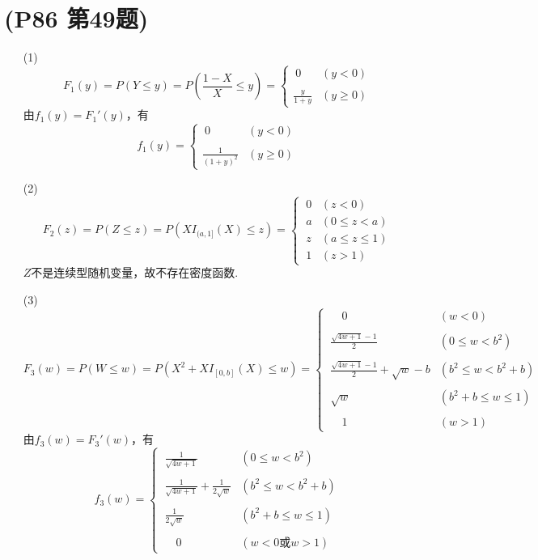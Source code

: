 \documentclass{article}
\begin{document}
\section{(P86 第49题)}  %
\begin{enumerate}
    \item [(1)]
    \[
        F_1 (y)= 
        P(Y\leq y)=  
        P(\frac{1-X}{X}\leq y)=
        \begin{cases}
            \ 0 & (y<0)\\
            \\
            \displaystyle{\frac{y}{1+y}} & (y\geq 0)
        \end{cases}   
    \]
    由$f_1(y) = F_1 '(y)$，有
    \[
        f_1 (y)=
        \begin{cases}
            \ 0 & (y<0)\\
            \\
            \displaystyle{\frac{1}{{(1+y)}^2}} & (y\geq 0)
        \end{cases}  
    \]
    \item [(2)]
    \[
        F_2 (z)=
        P(Z\leq z)=
        P(XI_{(a,1]} (X) \leq z)=
        \begin{cases}
            \ 0 & (z<0)\\
            \ a & (0\leq z <a)\\
            \ z & (a\leq z \leq 1)\\
            \ 1 & (z>1)
        \end{cases} 
    \]
    $Z$不是连续型随机变量，故不存在密度函数.
    \item [(3)]
    \[
        F_3 (w)=
        P(W\leq w)=
        P(X^2 + XI_{[0,b]}(X) \leq w)=
        \begin{cases}
            \ \quad 0 & (w<0)\\
            \\
            \ \displaystyle{\frac{\sqrt{4w+1}-1}{2}} & (0\leq w < b^2)\\
            \\
            \ \displaystyle{\frac{\sqrt{4w+1}-1}{2} + \sqrt{w}-b} & (b^2 \leq w < b^2 +b) \\
            \\
            \ \sqrt{w} & (b^2 + b \leq w \leq 1)\\
            \\
            \ \quad 1 & (w>1)
        \end{cases}   
    \]
    由$f_3 (w) = F_3 '(w)$，有
    \[
        f_3 (w) = 
        \begin{cases}
            \ \displaystyle{\frac{1}{\sqrt{4w+1}}} & (0\leq w < b^2)\\
            \\
            \ \displaystyle{\frac{1}{\sqrt{4w+1}} + \frac{1}{2\sqrt{w}}} & (b^2 \leq w < b^2 +b)\\
            \\
            \ \displaystyle{\frac{1}{2\sqrt{w}}} & (b^2 + b \leq w \leq 1)\\
            \\
            \ \quad 0 & (w<0\mbox{或}w>1)
        \end{cases}
    \]
\end{enumerate}
\end{document}
